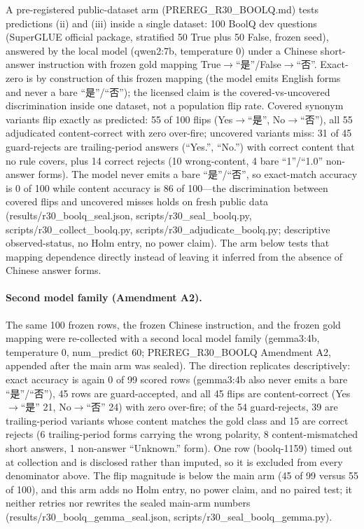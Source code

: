 \documentclass[10pt]{article} %
\begin{document}
A pre-registered public-dataset arm (PREREG\_R30\_BOOLQ.md) tests predictions (ii) and (iii) inside a single dataset: 100 BoolQ dev questions (SuperGLUE official package, stratified 50 True plus 50 False, frozen seed), answered by the local model (qwen2:7b, temperature 0) under a Chinese short-answer instruction with frozen gold mapping True$\to$``是''/False$\to$``否''. Exact-zero is by construction of this frozen mapping (the model emits English forms and never a bare ``是''/``否''); the licensed claim is the covered-vs-uncovered discrimination inside one dataset, not a population flip rate. Covered synonym variants flip exactly as predicted: 55 of 100 flips (Yes$\to$``是'', No$\to$``否''), all 55 adjudicated content-correct with zero over-fire; uncovered variants miss: 31 of 45 guard-rejects are trailing-period answers (``Yes.'', ``No.'') with correct content that no rule covers, plus 14 correct rejects (10 wrong-content, 4 bare ``1''/``1.0'' non-answer forms). The model never emits a bare ``是''/``否'', so exact-match accuracy is 0 of 100 while content accuracy is 86 of 100---the discrimination between covered flips and uncovered misses holds on fresh public data (results/r30\_boolq\_seal.json, scripts/r30\_seal\_boolq.py, scripts/r30\_collect\_boolq.py, scripts/r30\_adjudicate\_boolq.py; descriptive observed-status, no Holm entry, no power claim). The arm below tests that mapping dependence directly instead of leaving it inferred from the absence of Chinese answer forms.

\paragraph*{Second model family (Amendment A2).} The same 100 frozen rows, the frozen Chinese instruction, and the frozen gold mapping were re-collected with a second local model family (gemma3:4b, temperature 0, num\_predict 60; PREREG\_R30\_BOOLQ Amendment A2, appended after the main arm was sealed). The direction replicates descriptively: exact accuracy is again 0 of 99 scored rows (gemma3:4b also never emits a bare ``是''/``否''), 45 rows are guard-accepted, and all 45 flips are content-correct (Yes$\to$``是'' 21, No$\to$``否'' 24) with zero over-fire; of the 54 guard-rejects, 39 are trailing-period variants whose content matches the gold class and 15 are correct rejects (6 trailing-period forms carrying the wrong polarity, 8 content-mismatched short answers, 1 non-answer ``Unknown.'' form). One row (boolq-1159) timed out at collection and is disclosed rather than imputed, so it is excluded from every denominator above. The flip magnitude is below the main arm (45 of 99 versus 55 of 100), and this arm adds no Holm entry, no power claim, and no paired test; it neither retries nor rewrites the sealed main-arm numbers (results/r30\_boolq\_gemma\_seal.json, scripts/r30\_seal\_boolq\_gemma.py).
\end{document}
